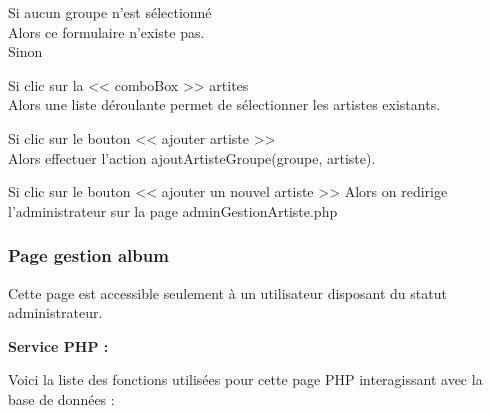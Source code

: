 			\begin{paragraphe}
				Si aucun groupe n'est sélectionné \\
				Alors ce formulaire n'existe pas. \\
				Sinon
			\end{paragraphe}

			\begin{paragraphe}
				Si clic sur la << comboBox >> artites \\
				Alors une liste déroulante permet de sélectionner les artistes existants.
			\end{paragraphe}

			\begin{paragraphe}
				Si clic sur le bouton << ajouter artiste >> \\
				Alors effectuer l'action ajoutArtisteGroupe(groupe, artiste).
			\end{paragraphe}

			\begin{paragraphe}
				Si clic sur le bouton << ajouter un nouvel artiste >>
				Alors on redirige l'administrateur sur la page adminGestionArtiste.php
			\end{paragraphe}

		\subsubsection{Page gestion album}

			\begin{paragraphe}
				Cette page est accessible seulement à un utilisateur disposant du statut administrateur.
			\end{paragraphe}

			\begin{paragraphe}
				\textbf{Service PHP :}
			\end{paragraphe}

			\begin{paragraphe}
				Voici la liste des fonctions utilisées pour cette page PHP interagissant avec la base de données :
			\end{paragraphe}

